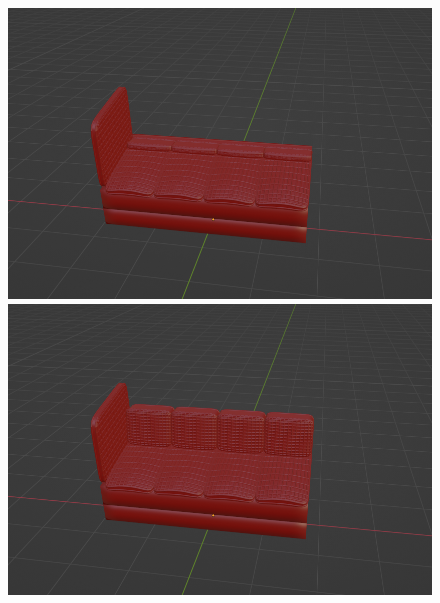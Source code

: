 \begin{figure}[h]
 \begin{minipage}[b]{0.48\linewidth}
  \centering
  \includegraphics[scale=0.17]{./imgs/sofaParamMean/backCushionHeightMin.png}
 \end{minipage}
 \begin{minipage}[b]{0.48\linewidth}
  \centering
  \includegraphics[scale=0.17]{./imgs/sofaParamMean/backCushionHeightMax.png}
 \end{minipage}\\
 \begin{minipage}[b]{0.48\linewidth}
  \centering

\end{minipage}
\end{figure}
